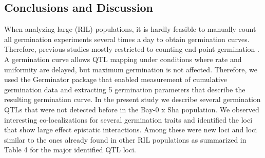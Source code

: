 \subsection{Conclusions and Discussion}
When analyzing large (RIL) populations, it is hardly feasible to manually count all germination 
experiments several times a day to obtain germination curves. Therefore, previous studies mostly 
restricted to counting end-point germination \cite{Quesada:2002, Alonso-Blanco:2003, Clerkx:2004, 
Laserna:2008, Meng:2008, Bentsink:2010, Galpaz:2010, Vallejo:2010}. A germination curve allows QTL 
mapping under conditions where rate and uniformity are delayed, but maximum germination is not 
affected. Therefore, we used the Germinator package \cite{Joosen:2010} that enabled measurement 
of cumulative germination data and extracting 5 germination parameters that describe the resulting 
germination curve. In the present study we describe several germination QTLs that were not detected 
before in the Bay-0 x Sha population. We observed interesting co-localizations for several germination 
traits and identified the loci that show large effect epistatic interactions. Among these were new 
loci and loci similar to the ones already found in other RIL populations as summarized in Table 4 for 
the major identified QTL loci.

